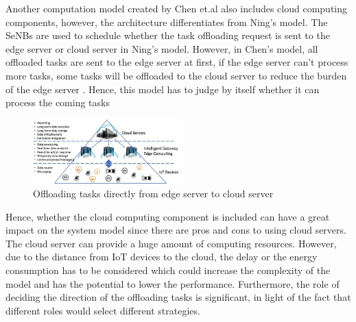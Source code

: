 \documentclass[a4paper,11pt]{article}
\begin{document}
Another computation model created by Chen et.al also includes cloud computing components, however, the architecture differentiates from Ning's model. The SeNBs are used to schedule whether the task offloading request is sent to the edge server or cloud server in Ning's model. However, in Chen's model, all offloaded tasks are sent to the edge server at first, if the edge server can't process more tasks, some tasks will be offloaded to the cloud server to reduce the burden of the edge server \cite{cloud_2_edgeconnectedtocloud}. Hence, this model has to judge by itself whether it can process the coming tasks 

\begin{figure}[h]
        \centering
        \includegraphics[width=0.5\textwidth]{edgeconnectedcloud.jpg}
        \caption{Offloading tasks directly from edge server to cloud server \cite{aim_offloading}}
\end{figure}
\newpage
Hence, whether the cloud computing component is included can have a great impact on the system model since there are pros and cons to using cloud servers. The cloud server can provide a huge amount of computing resources. However, due to the distance from IoT devices to the cloud, the delay or the energy consumption has to be considered which could increase the complexity of the model and has the potential to lower the performance. Furthermore, the role of deciding the direction of the offloading tasks is significant, in light of the fact that different roles would select different strategies. 


\end{document}
